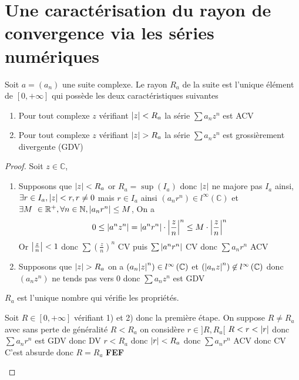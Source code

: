 \documentclass[11pt,hidelinks]{book}
\theoremstyle{mytheoremstyle}
\theoremstyle{mytheoremstyle}
\theoremstyle{mytheoremstyle}
\theoremstyle{mytheoremstyle}
\theoremstyle{mytheoremstyle}
\theoremstyle{mytheoremstyle}
\theoremstyle{mytheoremstyle}
\theoremstyle{mytheoremstyle}
\theoremstyle{myproblemstyle}
\def\mbb#1{\mathbb{#1}}
\def\bN{\mbb{N}}
\def\bC{\mbb{C}}
\def\bR{\mbb{R}}
\def\z{$z \in \bC$}
\def\born{l^{\infty}\left( \bC \right)}
\def\fef{\textbf{FEF}}
\newcommand{\parenth}[1]{\left(#1\right)}
\begin{document}
\section{Une caractérisation du rayon de convergence via les séries numériques}
\begin{adjustwidth}{-2em}{-1em}
    \begin{theorem}
        Soit $a = (a_n)$ une suite complexe. Le rayon $R_a$ de la suite est l'unique élément
        de $[0,+\infty]$ qui possède les deux caractéristiques suivantes 
        \begin{enumerate}
        \item Pour tout complexe $z$ vérifiant $\abs{z} < R_a$ la série $\sum a_n z^n$ est ACV 
        \item Pour tout complexe $z$ vérifiant $\abs{z} > R_a$ la série $\sum a_n z^n$ est grossièrement divergente (GDV)
        \end{enumerate}
        \begin{proof}
            Soit \z, 
            \begin{enumerate}
            \item Supposons que $\abs{z} < R_a$ or $R_a = \sup (I_a)$ donc $\abs{z}$ ne majore pas $I_a$
            ainsi, $\exists r \in I_a, \abs{z} < r, r \not= 0$ mais $r \in I_a$ ainsi $(a_nr^n) \in \born$
            et $\exists M \in \bR^+, \forall n \in \bN, \abs{a_nr^n} \leq M$, 
            On a
            \begin{equation*}
                0 \leq \abs{a^n z^n} = \abs{a^nr^n} \cdot \abs{\frac{z}{n}}^n \leq M \cdot \abs{\frac{z}{n}}^n
            \end{equation*}
            Or $\abs{\frac{z}{n}} < 1$ donc $\sum \left(\frac{z}{n}\right)^n$ CV puis $\sum \abs{a^nr^n}$ CV
            donc $\sum a_nr^n$ ACV 
            
            \item Supposons que $\abs{z} > R_a$ on a $\parenth{a_n\abs{z}^n} \in \born$ et $\parenth{\abs{a_nz}^n} \not \in \born$
            donc $(a_nz^n)$ ne tends pas vers $0$ donc $\sum a_nz^n$ est GDV
             
            \end{enumerate}
                
            $R_a$ est l'unique nombre qui vérifie les propriétés.
            \begin{ef}
                Soit $R \in [0, +\infty]$ vérifiant 1) et 2) donc la première étape.
                On suppose $R \not= R_a$ avec sans perte de généralité $R < R_a$ 
                on considère $r \in ]R,R_a[$ 
                $R < r < \abs{r}$ donc $\sum a_n r^n$ est GDV donc DV 
                $r < R_a$ donc $\abs{r} < R_a$ donc $\sum a_n r^n$ ACV donc CV 
                C'est absurde donc $R = R_a$
                \fef 
            \end{ef}
        \end{proof}


\end{theorem}
\end{adjustwidth}
\end{document}
